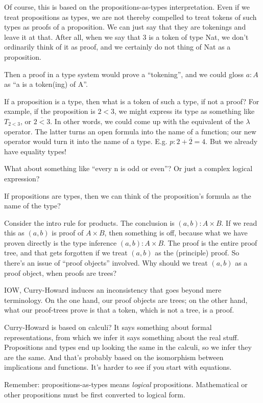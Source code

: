 \documentclass{article}
\begin{document}
Of course, this is based on the propositions-as-types interpretation.
Even if we treat propositions as types, we are not thereby compelled
to treat tokens of such types as proofs of a proposition. We can just
say that they are tokenings and leave it at that. After all, when we
say that 3 is a token of type Nat, we don't ordinarily think of it as
proof, and we certainly do not thing of Nat as a proposition.

Then a proof in a type system would prove a ``tokening'', and we could
gloss \(a:A\) as ``a is a token(ing) of A''.

If a proposition is a type, then what is a token of such a type, if
not a proof? For example, if the proposition is \(2<3\), we might
express its type as something like \(T_{2<3}\), or \(\overline{2<3}\).
In other words, we could come up with the equivalent of the
\(\lambda\) operator. The latter turns an open formula into the name
of a function; our new operator would turn it into the name of a type.
E.g. \(p: \overline{2+2=4}\).  But we already have equality types!

What about something like ``every n is odd or even''? Or just a
complex logical expression?

If propositions are types, then we can think of the proposition's
formula as the name of the type?

Consider the intro rule for products. The conclusion is
\((a,b):A\times B\). If we read this as \((a,b)\) is proof of
\(A\times B\), then something is off, because what we have proven
directly is the type inference \((a,b):A\times B\). The proof is the
entire proof tree, and that gets forgotten if we treat \((a,b)\) as
the (principle) proof. So there's an issue of ``proof objects''
involved. Why should we treat \((a,b)\) as a proof object, when proofs
are trees?

IOW, Curry-Howard induces an inconsistency that goes beyond mere
terminology. On the one hand, our proof objects are trees; on the
other hand, what our proof-trees prove is that a token, which is not a
tree, is a proof.

Curry-Howard is based on calculi? It says something about formal
representations, from which we infer it says something about the real
stuff. Propositions and types end up looking the same in the calculi,
so we infer they are the same. And that's probably based on the
isomorphism between implications and functions. It's harder to see if
you start with equations.

Remember: propositions-as-types means \textit{logical} propositions.
Mathematical or other propositions must be first converted to logical
form.
\end{document}
